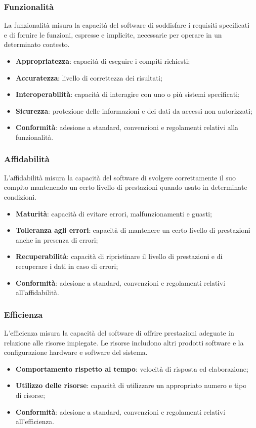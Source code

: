 \subsubsection{Funzionalità}
La funzionalità misura la capacità del software di soddisfare i requisiti specificati e di fornire le funzioni,
espresse e implicite, necessarie per operare in un determinato contesto.
\begin{itemize}
    \item \textbf{Appropriatezza}: capacità di eseguire i compiti richiesti;
    \item \textbf{Accuratezza}: livello di correttezza dei risultati;
    \item \textbf{Interoperabilità}: capacità di interagire con uno o più sistemi specificati;
    \item \textbf{Sicurezza}: protezione delle informazioni e dei dati da accessi non autorizzati;
    \item \textbf{Conformità}: adesione a standard, convenzioni e regolamenti relativi alla funzionalità.
\end{itemize}

\subsubsection{Affidabilità}
L'affidabilità misura la capacità del software di svolgere correttamente il suo compito
mantenendo un certo livello di prestazioni quando usato in determinate condizioni.
\begin{itemize}
    \item \textbf{Maturità}: capacità di evitare errori, malfunzionamenti e guasti;
    \item \textbf{Tolleranza agli errori}: capacità di mantenere un certo livello di prestazioni anche in presenza di errori;
    \item \textbf{Recuperabilità}: capacità di ripristinare il livello di prestazioni e di recuperare
        i dati in caso di errori;
    \item \textbf{Conformità}: adesione a standard, convenzioni e regolamenti relativi all'affidabilità.
\end{itemize}

\subsubsection{Efficienza}
L'efficienza misura la capacità del software di offrire prestazioni adeguate in relazione alle risorse impiegate.
Le risorse includono altri prodotti software e la configurazione hardware e software del sistema.
\begin{itemize}
    \item \textbf{Comportamento rispetto al tempo}: velocità di risposta ed elaborazione;
    \item \textbf{Utilizzo delle risorse}: capacità di utilizzare un appropriato numero e tipo di risorse;
    \item \textbf{Conformità}: adesione a standard, convenzioni e regolamenti relativi all'efficienza.
\end{itemize}

